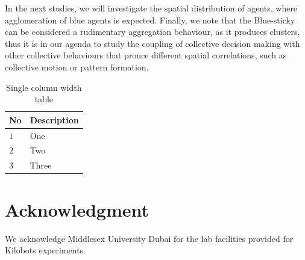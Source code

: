 \documentclass[journal]{IEEEtran}
\begin{document}
In the next studies, we will investigate the spatial distribution of agents, where agglomeration of blue agents is expected.  Finally, we note that the Blue-sticky can be considered a rudimentary aggregation behaviour, as it produces clusters, thus it is in our agenda to study the coupling of collective decision making with other collective behaviours that prouce different spatial correlations, such as collective motion or pattern formation. 

\begin{table}
\centering
\begin{tabular}{|p{}|p{}|}
\hline
No & Description \\
\hline
$1$ & One \\
$2$ & Two \\
$3$ & Three \\
\hline
\end{tabular}
\caption{Single column width table}
\end{table}


\section*{Acknowledgment}
We acknowledge Middlesex University Dubai for the lab facilities provided for Kilobots experiments.



\end{document}
